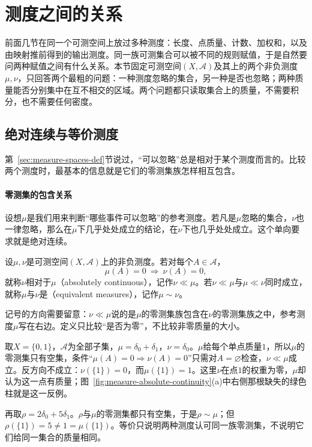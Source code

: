 \section{测度之间的关系}
\label{sec:measure-relations}

前面几节在同一个可测空间上放过多种测度：长度、点质量、计数、加权和，以及由映射推前得到的输出测度。同一族可测集合可以被不同的规则赋值，于是自然要问两种赋值之间有什么关系。本节固定可测空间$(X,\mathcal A)$及其上的两个非负测度$\mu,\nu$，只回答两个最粗的问题：一种测度忽略的集合，另一种是否也忽略；两种质量能否分别集中在互不相交的区域。两个问题都只读取集合上的质量，不需要积分，也不需要任何密度。

\subsection{绝对连续与等价测度}
\label{sec:measure-absolute-continuity}

第~\ref{sec:measure-spaces-def}节说过，“可以忽略”总是相对于某个测度而言的。比较两个测度时，最基本的信息就是它们的零测集族怎样相互包含。

\paragraph{零测集的包含关系}
设想$\mu$是我们用来判断“哪些事件可以忽略”的参考测度。若凡是$\mu$忽略的集合，$\nu$也一律忽略，那么在$\mu$下几乎处处成立的结论，在$\nu$下也几乎处处成立。这个单向要求就是绝对连续。

\begin{definition}[绝对连续与等价测度]
\label{def:measure-absolutely-continuous}
设$\mu,\nu$是可测空间$(X,\mathcal A)$上的非负测度。若对每个$A\in\mathcal A$，
\[
 \mu(A)=0\ \Longrightarrow\ \nu(A)=0,
\]
就称$\nu$相对于$\mu$（absolutely continuous），记作$\nu\ll\mu$。若$\nu\ll\mu$与$\mu\ll\nu$同时成立，就称$\mu$与$\nu$是（equivalent measures），记作$\mu\sim\nu$。
\end{definition}

记号的方向需要留意：$\nu\ll\mu$说的是$\mu$的零测集族包含在$\nu$的零测集族之中，参考测度$\mu$写在右边。定义只比较“是否为零”，不比较非零质量的大小。

\begin{example}[两点空间上的单向关系]
取$X=\{0,1\}$，$\mathcal A$为全部子集，$\mu=\delta_0+\delta_1$，$\nu=\delta_0$。$\mu$给每个单点质量$1$，所以$\mu$的零测集只有空集，条件“$\mu(A)=0\Rightarrow\nu(A)=0$”只需对$A=\varnothing$检查，$\nu\ll\mu$成立。反方向不成立：$\nu(\{1\})=0$，而$\mu(\{1\})=1$。这里$\nu$在点$1$的权重为零，$\mu$却认为这一点有质量；图~\ref{fig:measure-absolute-continuity}(a)中右侧那根缺失的绿色柱就是这一反例。

再取$\rho=2\delta_0+5\delta_1$。$\rho$与$\mu$的零测集都只有空集，于是$\rho\sim\mu$；但$\rho(\{1\})=5\ne1=\mu(\{1\})$。等价只说明两种测度认可同一族零测集，不说明它们给同一集合的质量相同。
\end{example}

